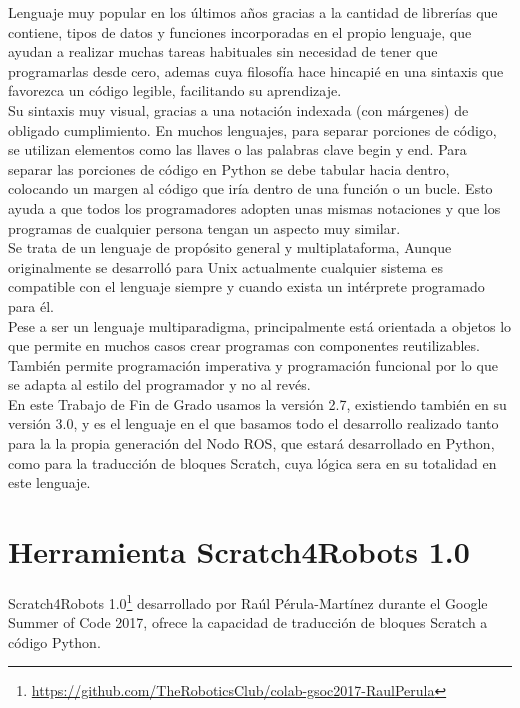 Lenguaje muy popular en los últimos años gracias a la cantidad de librerías que contiene, tipos de datos y funciones incorporadas en el propio lenguaje, que ayudan a realizar muchas tareas habituales sin necesidad de tener que programarlas desde cero, ademas cuya filosofía hace hincapié en una sintaxis que favorezca un código legible, facilitando su aprendizaje.\\

Su sintaxis muy visual, gracias a una notación indexada (con márgenes) de obligado cumplimiento. En muchos lenguajes, para separar porciones de código, se utilizan elementos como las llaves o las palabras clave begin y end. Para separar las porciones de código en Python se debe tabular hacia dentro, colocando un margen al código que iría dentro de una función o un bucle. Esto ayuda a que todos los programadores adopten unas mismas notaciones y que los programas de cualquier persona tengan un aspecto muy similar.\\

Se trata de un lenguaje de propósito general y multiplataforma, Aunque originalmente se desarrolló para Unix actualmente cualquier sistema es compatible con el lenguaje siempre y cuando exista un intérprete programado para él.\\

Pese a ser un lenguaje multiparadigma, principalmente está orientada a objetos lo que permite en muchos casos crear programas con componentes reutilizables. También permite programación imperativa y programación funcional por lo que se adapta al estilo del programador y no al revés.\\

En este Trabajo de Fin de Grado usamos la versión 2.7, existiendo también en su versión 3.0, y es el lenguaje en el que basamos todo el desarrollo realizado tanto para la  la propia generación del Nodo ROS, que estará desarrollado en Python, como para la traducción de bloques Scratch, cuya lógica sera en su totalidad en este lenguaje.\\

\section{Herramienta Scratch4Robots 1.0}
Scratch4Robots 1.0\footnote{\url{https://github.com/TheRoboticsClub/colab-gsoc2017-RaulPerula}} desarrollado por Raúl Pérula-Martínez durante el Google Summer of Code 2017, ofrece la capacidad de traducción de bloques Scratch a código Python.\\

